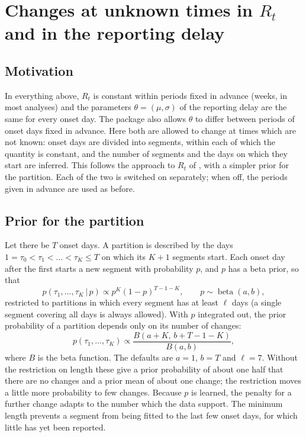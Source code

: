 \documentclass[11pt,a4paper]{article}
\newcommand{\given}{\,|\,}
\begin{document}
\section{Changes at unknown times in $R_t$ and in the reporting delay}\label{sec:changepoints}

\subsection{Motivation}

In everything above, $R_t$ is constant within periods fixed in advance (weeks,
in most analyses) and the parameters $\theta=(\mu,\sigma)$ of the reporting
delay are the same for every onset day. The package also allows $\theta$ to
differ between periods of onset days fixed in advance. Here both are allowed to
change at times which are not known: onset days are divided into segments,
within each of which the quantity is constant, and the number of segments and
the days on which they start are inferred. This follows the approach to $R_t$
of \cite{creswell2022}, with a simpler prior for the partition. Each of the two
is switched on separately; when off, the periods given in advance are used as
before.

\subsection{Prior for the partition}

Let there be $T$ onset days. A partition is described by the days
$1=\tau_0<\tau_1<\dots<\tau_K\le T$ on which its $K+1$ segments start. Each
onset day after the first starts a new segment with probability $p$, and $p$
has a beta prior, so that
\begin{equation}\label{eq:partitionprior}
p(\tau_1,\dots,\tau_K\given p) \propto p^{K}(1-p)^{T-1-K}, \qquad
p\sim\operatorname{beta}(a,b),
\end{equation}
restricted to partitions in which every segment has at least $\ell$ days (a
single segment covering all days is always allowed). With $p$ integrated out,
the prior probability of a partition depends only on its number of changes:
\begin{equation}\label{eq:partitionmarginal}
p(\tau_1,\dots,\tau_K) \propto \frac{B(a+K,\,b+T-1-K)}{B(a,b)},
\end{equation}
where $B$ is the beta function. The defaults are $a=1$, $b=T$ and $\ell=7$.
Without the restriction on length these give a prior probability of about one
half that there are no changes and a prior mean of about one change; the
restriction moves a little more probability to few changes. Because $p$ is
learned, the penalty for a further change adapts to the number which the data
support. The minimum length prevents a segment from being fitted to the last
few onset days, for which little has yet been reported.
\end{document}
